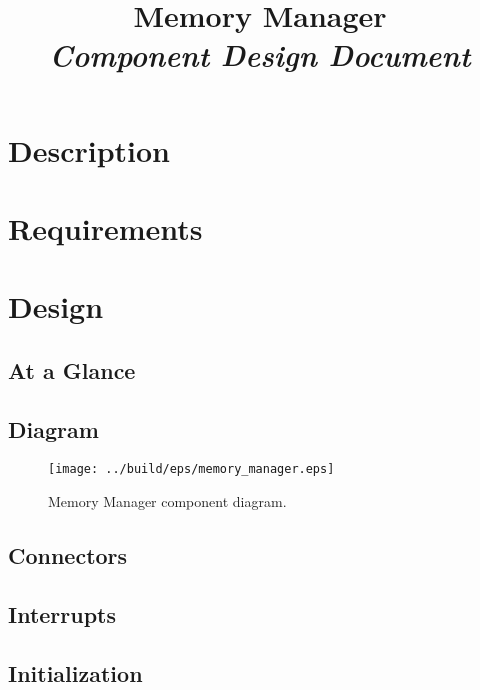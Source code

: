 



\title{\textbf{Memory Manager} \\
\large\textit{Component Design Document}}
\date{}
\maketitle

\section{Description}


\section{Requirements}


\section{Design}

\subsection{At a Glance}


\subsection{Diagram}
\begin{figure}[H]
  \texttt{[image: ../build/eps/memory\_manager.eps]}
  \caption{Memory Manager component diagram.}
\end{figure}

\subsection{Connectors}


\subsection{Interrupts}



\subsection{Initialization}


